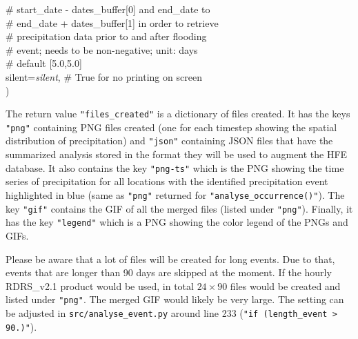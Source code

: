 \documentclass[10pt,a4paper,titlepage,parskip]{scrartcl}
\newenvironment{ttfont}{\fontfamily{\ttdefault}\selectfont}{\par}
\newcommand{\GRAU}[1]{\textcolor{ufzgray2}{#1}}
\begin{document}
\begin{framed}
\begin{ttfont}
\begin{tabbing}
			\> \> \GRAU{\# start\_date - dates\_buffer[0] and end\_date to }\\
			\> \> \GRAU{\# end\_date + dates\_buffer[1] in order to retrieve}\\
			\> \> \GRAU{\# precipitation data prior to and after flooding}\\
			\> \> \GRAU{\# event; needs to be non-negative; unit: days}\\
			\> \> \GRAU{\# default [5.0,5.0]}\\
			\> silent=\textit{silent}, \> \GRAU{\# True for no printing on screen}\\
			\> ) \> 
		\end{tabbing}
	\end{ttfont}
	\vspace*{-0.3cm}
\end{framed}
\vspace*{-0.3cm}
The return value \texttt{"files\_created"} is a dictionary of files created. It has the keys \texttt{"png"} containing PNG files created (one for each timestep showing the spatial distribution of precipitation) and \texttt{"json"} containing JSON files that have the summarized analysis stored in the format they will be used to augment the HFE database. It also contains the key \texttt{"png-ts"} which is the PNG showing the time series of precipitation for all locations with the identified precipitation event highlighted in blue (same as \texttt{"png"} returned for \texttt{"analyse\_occurrence()"}). The key \texttt{"gif"} contains the GIF of all the merged files (listed under \texttt{"png"}). Finally, it has the key \texttt{"legend"} which is a PNG showing the color legend of the PNGs and GIFs. 

Please be aware that a lot of files will be created for long events. Due to that, events that are longer than 90 days are skipped at the moment. If the hourly RDRS\_v2.1 product would be used, in total $24\times90$ files would be created and listed under \texttt{"png"}. The merged GIF would likely be very large. The setting can be adjusted in \texttt{src/analyse\_event.py} around line 233 (\texttt{"if (length\_event > 90.)"}).
\pagebreak
\end{document}
